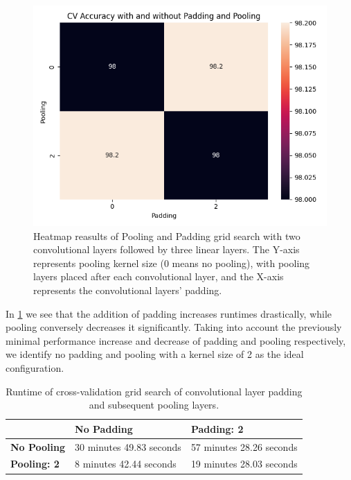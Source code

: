 \begin{figure}[H]
    \centering
    \includegraphics[width=\textwidth]{results/cnn_grid_search/heatmap_grid_search_pp.png}
    \caption{Heatmap reasults of Pooling and Padding grid search with two convolutional layers followed by three linear layers. The Y-axis represents pooling kernel size (0 means no pooling), with pooling layers placed after each convolutional layer, and the X-axis represents the convolutional layers' padding.}
    \label{fig:cnn_pp}
\end{figure}

In \ref{table:runtimes_pp} we see that the addition of padding increases runtimes drastically, while pooling conversely decreases it significantly. Taking into account the previously minimal performance increase and decrease of padding and pooling respectively, we identify no padding and pooling with a kernel size of 2 as the ideal configuration.

\begin{table}[H]
    \centering
    \caption{Runtime of cross-validation grid search of convolutional layer padding and subsequent pooling layers.}
    \label{table:runtimes_pp}
\begin{tabular}{|l|l|l|}
\hline
                    & \textbf{No Padding}      & \textbf{Padding: 2}      \\ \hline
\textbf{No Pooling} & 30 minutes 49.83 seconds & 57 minutes 28.26 seconds \\ \hline
\textbf{Pooling: 2} & 8 minutes 42.44 seconds  & 19 minutes 28.03 seconds \\ \hline
\end{tabular}
\end{table}

